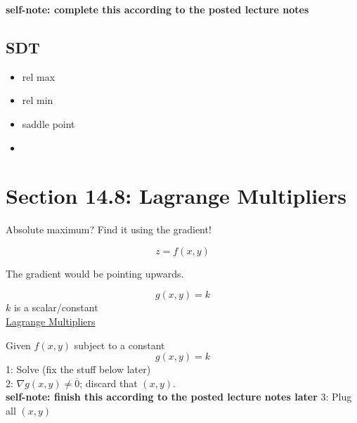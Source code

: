 \documentclass{article}
\begin{document}
\renewcommand{\familydefault}{\rmdefault}



\setcounter{page}{0}
\newpage
\tableofcontents
\newpage






\normalsize

\setcounter{page}{1}

\textbf{self-note: complete this according to the posted lecture notes}

\subsection*{SDT}
\begin{itemize}
    \item rel max
    \item rel min
    \item saddle point
    \item 
\end{itemize}

\section*{Section 14.8: Lagrange Multipliers}
\begin{illustrationbox}

\end{illustrationbox}
Absolute maximum? Find it using the gradient!

\[
    z = f(x, y)
\]

The gradient would be pointing upwards.

\[
  g(x, y) = k
\]
\( k \) is a scalar/constant \\
\noindent
\underline{Lagrange Multipliers} \\
\begin{examplebox}
    Given \( f(x, y) \) subject to a constant
    \[
        g(x, y) = k
    \]
    1: Solve
    (fix the stuff below later) \\
    2: \( \nabla g(x, y) \neq \overline{0} \); discard that \( (x, y) \). \\
    \textbf{self-note: finish this according to the posted lecture notes later}
    3: Plug all \( (x, y) \) 
\end{examplebox}
\end{document}
